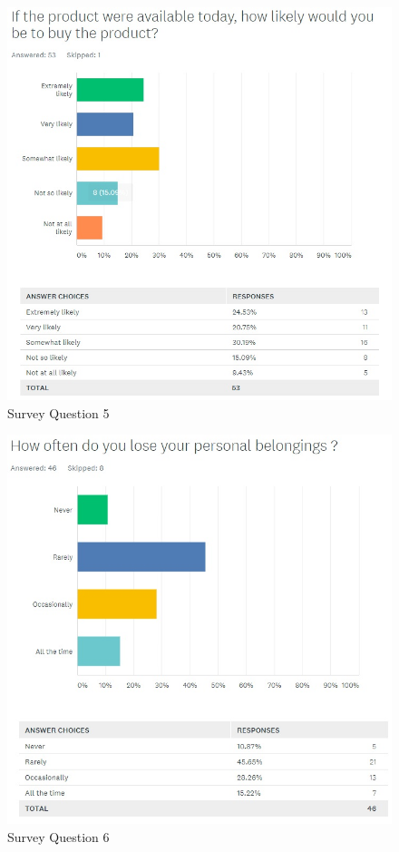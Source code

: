 \documentclass[12pt,a4paper]{article}
\begin{document}
\begin{appendices}
        \begin{figure}[H]
          \centering
          \includegraphics[width=1\textwidth]{../assets/12-2-survey-5.jpg}
          \caption{Survey Question 5}
          \label{fig:Survey Question 5}
        \end{figure}
      
        \begin{figure}[H]
          \centering
          \includegraphics[width=1\textwidth]{../assets/12-2-survey-6.jpg}
          \caption{Survey Question 6}
          \label{fig:Survey Question 6}
        \end{figure}


\end{appendices}
\end{document}
